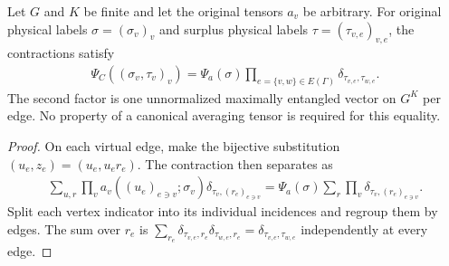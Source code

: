 \begin{lemma}%
    \label{thm:peps_regular_graph_surplus_factorization}
    \leanok
    Let $G$ and $K$ be finite and let the original tensors $a_v$ be
    arbitrary. For original physical labels $\sigma=(\sigma_v)_v$ and
    surplus physical labels $\tau=(\tau_{v,e})_{v,e}$, the
    contractions satisfy
    \begin{align}
        \Psi_C((\sigma_v,\tau_v)_v)
        =\Psi_a(\sigma)
        \prod_{e=\{v,w\}\in E(\Gamma)}
        \delta_{\tau_{v,e},\tau_{w,e}}.
    \end{align}
    The second factor is one unnormalized maximally entangled vector on
    $G^K$ per edge. No property of a canonical averaging tensor is required
    for this equality.
\end{lemma}

\begin{proof}\leanok
    On each virtual edge, make the bijective substitution
    $(u_e,z_e)=(u_e,u_er_e)$. The contraction then separates as
    \begin{align}
        \sum_{u,r}\prod_v
        a_v((u_e)_{e\ni v};\sigma_v)
        \delta_{\tau_v,(r_e)_{e\ni v}}
        =\Psi_a(\sigma)
        \sum_r\prod_v\delta_{\tau_v,(r_e)_{e\ni v}}.
    \end{align}
    Split each vertex indicator into its individual incidences and regroup
    them by edges. The sum over $r_e$ is
    $\sum_{r_e}\delta_{\tau_{v,e},r_e}\delta_{\tau_{w,e},r_e}
        =\delta_{\tau_{v,e},\tau_{w,e}}$ independently at every edge.
\end{proof}
